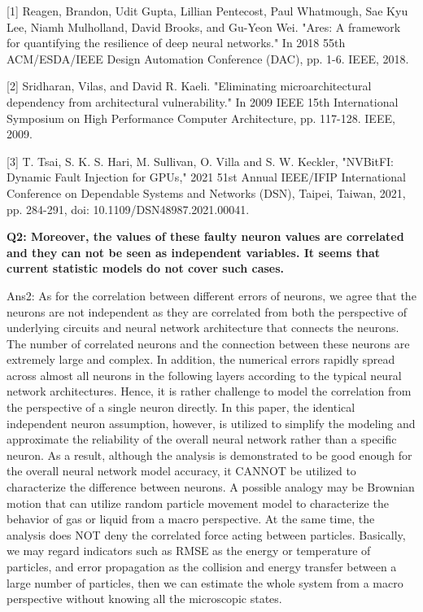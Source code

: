 [1] Reagen, Brandon, Udit Gupta, Lillian Pentecost, Paul Whatmough, Sae Kyu Lee, Niamh Mulholland, David Brooks, and Gu-Yeon Wei. "Ares: A framework for quantifying the resilience of deep neural networks." In 2018 55th ACM/ESDA/IEEE Design Automation Conference (DAC), pp. 1-6. IEEE, 2018.

[2] Sridharan, Vilas, and David R. Kaeli. "Eliminating microarchitectural dependency from architectural vulnerability." In 2009 IEEE 15th International Symposium on High Performance Computer Architecture, pp. 117-128. IEEE, 2009.

[3] T. Tsai, S. K. S. Hari, M. Sullivan, O. Villa and S. W. Keckler, "NVBitFI: Dynamic Fault Injection for GPUs," 2021 51st Annual IEEE/IFIP International Conference on Dependable Systems and Networks (DSN), Taipei, Taiwan, 2021, pp. 284-291, doi: 10.1109/DSN48987.2021.00041.

\textbf{Q2: Moreover, the values of these faulty neuron values are correlated and they can not be seen as independent variables. It seems that current statistic models do not cover such cases.}

Ans2: As for the correlation between different errors of neurons, we agree that the neurons are not independent as they are correlated from both the perspective of underlying circuits and neural network architecture that connects the neurons. The number of correlated neurons and the connection between these neurons are extremely large and complex. In addition, the numerical errors rapidly spread across almost all neurons in the following layers according to the typical neural network architectures. Hence, it is rather challenge to model the correlation from the perspective of a single neuron directly. In this paper, the identical independent neuron assumption, however, is utilized to simplify the modeling and approximate the reliability of the overall neural network rather than a specific neuron. As a result, although the analysis is demonstrated to be good enough for the overall neural network model accuracy, it CANNOT be utilized to characterize the difference between neurons. A possible analogy may be Brownian motion that can utilize random particle movement model to characterize the behavior of gas or liquid from a macro perspective. At the same time, the analysis does NOT deny the correlated force acting between particles. Basically, we may regard indicators such as RMSE as the energy or temperature of particles, and error propagation as the collision and energy transfer between a large number of particles, then we can estimate the whole system from a macro perspective without knowing all the microscopic states. 

